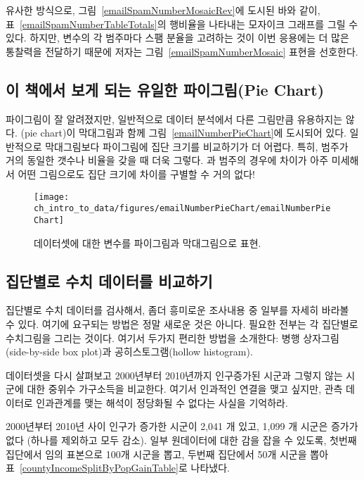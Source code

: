 유사한 방식으로, 그림~\ref{emailSpamNumberMosaicRev}에 도시된 바와 같이, 표~\ref{emailSpamNumberTableTotals}의 행비율을 나타내는 모자이크 그래프를 그릴 수 있다. 하지만,  변수의 각 범주마다 스팸 분율을 고려하는 것이 이번 응용에는 더 많은 통찰력을 전달하기 때문에 저자는 그림~\ref{emailSpamNumberMosaic} 표현을 선호한다.


\subsection{이 책에서 보게 되는 유일한 파이그림(Pie Chart)}

파이그림이 잘 알려졌지만, 일반적으로 데이터 분석에서 다른 그림만큼 유용하지는 않다. (pie chart)이 막대그림과 함께 그림~\vref{emailNumberPieChart}에 도시되어 있다. 일반적으로 막대그림보다 파이그림에 집단 크기를 비교하기가 더 어렵다. 특히, 범주가 거의 동일한 갯수나 비율을 갖을 때 더욱 그렇다.  과  범주의 경우에 차이가 아주 미세해서 어떤 그림으로도 집단 크기에 차이를 구별할 수 거의 없다!

\begin{figure}[h]
   \centering
   \texttt{[image: ch\_intro\_to\_data/figures/emailNumberPieChart/emailNumberPieChart]}
   \caption{  데이터셋에 대한  변수를 파이그림과 막대그림으로 표현.}
   \label{emailNumberPieChart}
\end{figure}


\subsection{집단별로 수치 데이터를 비교하기}
\label{comparingAcrossGroups}


집단별로 수치 데이터를 검사해서, 좀더 흥미로운 조사내용 중 일부를 자세히 바라볼 수 있다. 여기에 요구되는 방법은 정말 새로운 것은 아니다.
필요한 전부는 각 집단별로 수치그림을 그리는 것이다. 여기서 두가지 편리한 방법을 소개한다: 병행 상자그림(side-by-side box plot)과 공히스토그램(hollow histogram).

 데이터셋을 다시 살펴보고 2000년부터 2010년까지 인구증가된 시군과 그렇지 않는 시군에 대한 중위수 가구소득을 비교한다. 여기서 인과적인 연결을 맺고 싶지만, 관측 데이터로 인과관계를 맺는 해석이 정당화될 수 없다는 사실을 기억하라.

2000년부터 2010년 사이 인구가 증가한 시군이 2,041 개 있고, 1,099 개 시군은 증가가 없다 (하나를 제외하고 모두 감소). 일부 원데이터에 대한 감을 잡을 수 있도록, 첫번째 집단에서 임의 표본으로 100개 시군을 뽑고, 두번째 집단에서 50개 시군을 뽑아 표~\ref{countyIncomeSplitByPopGainTable}로 나타냈다. 



